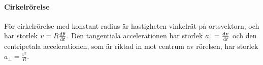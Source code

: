 \paragraph{Cirkelrörelse}
För cirkelrörelse med konstant radius är hastigheten vinkelrät på ortsvektorn, och har storlek $v = R\dv{\theta}{t}$. Den tangentiala accelerationen har storlek $a_{\parallel} = \dv{v}{t}$ och den centripetala accelerationen, som är riktad in mot centrum av rörelsen, har storlek $a_{\perp} = \frac{v^2}{R}$.